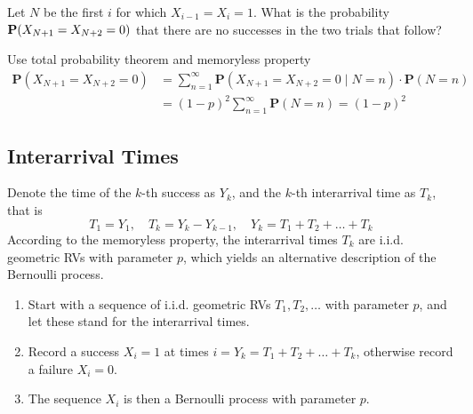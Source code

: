 \documentclass[device=normal, lang=en]{elegantbook}
\numberwithin{equation}{section}
\begin{document}
\begin{example}
    Let $N$ be the first $i$ for which $X_{i-1} = X_i = 1$. What is the probability $\mathbf{P}\qty(X_{N+1} = X_{N+2} = 0)$ that there are no successes in the two trials that follow?
\end{example}
\begin{solution}
    Use total probability theorem and memoryless property
    \begin{equation}
    \begin{aligned}
        \mathbf{P}(X_{N+1} = X_{N+2} = 0) &= \sum_{n=1}^{\infty} \mathbf{P}(X_{N+1} = X_{N+2} = 0 \mid N = n) \cdot \mathbf{P}(N = n) \\ 
        &= (1 - p)^2 \sum_{n=1}^{\infty} \mathbf{P}(N = n) = (1 - p)^2
    \end{aligned}
    \end{equation}
\end{solution}

\subsection{Interarrival Times}
Denote the time of the $k$-th success as $Y_k$, and the $k$-th interarrival time as $T_k$, that is 
\begin{equation}
    T_1 = Y_1, \quad T_k = Y_k - Y_{k-1}, \quad Y_k = T_1 + T_2 + \ldots + T_k
\end{equation}
According to the memoryless property, the interarrival times $T_k$ are i.i.d. geometric RVs with parameter $p$, which yields an alternative description of the Bernoulli process.
\begin{definition}
    \begin{enumerate}
        \item Start with a sequence of i.i.d. geometric RVs $T_1, T_2, \ldots$ with parameter $p$, and let these stand for the interarrival times.
        \item Record a success $X_i = 1$ at times $i = Y_k = T_1 + T_2 + \ldots + T_k$, otherwise record a failure $X_i = 0$.
        \item The sequence $X_i$ is then a Bernoulli process with parameter $p$.
    \end{enumerate}
\end{definition}
\end{document}
